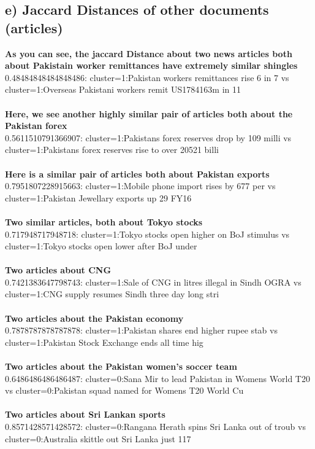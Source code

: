 \subsection*{e) Jaccard Distances of other documents (articles)}
\textbf{As you can see, the jaccard Distance about two news articles both about Pakistain worker remittances have extremely similar shingles}
\\
0.48484848484848486: cluster=1:Pakistan workers remittances rise 6 in 7  vs cluster=1:Overseas Pakistani workers remit US1784163m in 11 
\\
\\
\textbf{Here, we see another highly similar pair of articles both about the Pakistan forex}
\\
0.5611510791366907: cluster=1:Pakistans forex reserves drop by 109 milli vs cluster=1:Pakistans forex reserves rise to over 20521 billi 
\\
\\
\textbf{Here is a similar pair of articles both about Pakistan exports}
\\
0.7951807228915663: cluster=1:Mobile phone import rises by 677 per vs cluster=1:Pakistan Jewellary exports up 29 FY16 
\\
\\
\textbf{Two similar articles, both about Tokyo stocks}
\\
0.717948717948718: cluster=1:Tokyo stocks open higher on BoJ stimulus  vs cluster=1:Tokyo stocks open lower after BoJ under 
\\
\\
\textbf{Two articles about CNG}
\\
0.7421383647798743: cluster=1:Sale of CNG in litres illegal in Sindh OGRA vs cluster=1:CNG supply resumes Sindh three day long stri 
\\
\\
\textbf{Two articles about the Pakistan economy}
\\
0.7878787878787878: cluster=1:Pakistan shares end higher rupee stab vs cluster=1:Pakistan Stock Exchange ends all time hig 
\\
\\
\textbf{Two articles about the Pakistan women's soccer team}
\\
0.6486486486486487: cluster=0:Sana Mir to lead Pakistan in Womens World T20 vs cluster=0:Pakistan squad named for Womens T20 World Cu 
\\
\\
\textbf{Two articles about Sri Lankan sports}
\\
0.8571428571428572: cluster=0:Rangana Herath spins Sri Lanka out of troub vs cluster=0:Australia skittle out Sri Lanka just 117 
\\ 


